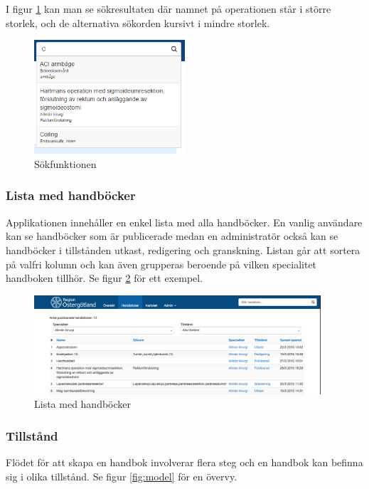 I figur \ref{fig:search} kan man se sökresultaten där namnet på operationen står i större storlek, och de alternativa sökorden kursivt i mindre storlek.

\begin{figure}[h!]
  \centering
  \includegraphics[width=0.5\textwidth]{images/site/search}
  \caption{Sökfunktionen}
  \label{fig:search}
\end{figure}


\subsubsection{Lista med handböcker}
Applikationen innehåller en enkel lista med alla handböcker. En vanlig användare kan se handböcker som är publicerade medan en administratör också kan se handböcker i tillstånden utkast, redigering och granskning. %
Listan går att sortera på valfri kolumn och kan även grupperas beroende på vilken specialitet handboken tillhör.
Se figur \ref{fig:list} för ett exempel.

\begin{figure}[h!]
  \centering
  \includegraphics[width=0.95\textwidth]{images/site/list}
  \caption{Lista med handböcker}
  \label{fig:list}
\end{figure}

\subsubsection{Tillstånd}
Flödet för att skapa en handbok involverar flera steg och en handbok kan befinna sig i olika tillstånd.
Se figur \ref{fig:model} för en övervy.

